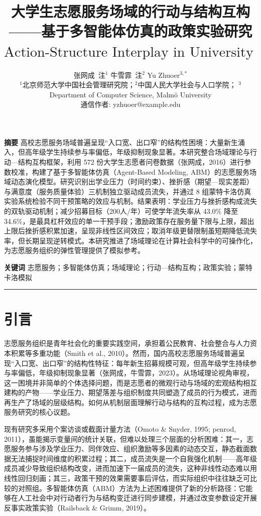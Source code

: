 \documentclass[12pt,a4paper]{article}
\title{\textbf{大学生志愿服务场域的行动与结构互构——基于多智能体仿真的政策实验研究}\\$\text{Action-Structure Interplay in University Volunteering Field: An Agent-Based Policy Experiment}$}
\author{\small 
  张网成\ 注$^1$ \quad 牛雪霏\ 注$^2$ \quad Yu Zhuoer$^{3,*}$
  \\\vspace{0.3em}
  \small $^1$北京师范大学中国社会管理研究院；$^2$中国人民大学社会与人口学院；
  $^{3}$Department of Computer Science, Malmö University
  \\\small *通信作者: yzhuoer@example.edu}
\date{}
\begin{document}
\maketitle
{}
\thispagestyle{empty}

\vspace{1em}
\textbf{摘要} \quad 
高校志愿服务场域普遍呈现“入口宽、出口窄”的结构性困境：大量新生涌入，但高年级学生持续参与率偏低，年级抑制现象显著。本研究整合场域理论与行动—结构互构框架，利用 572 份大学生志愿者问卷数据（张网成，2016）进行参数校准，构建了基于多智能体仿真（Agent-Based Modeling, ABM）的志愿服务场域动态演化模型。研究识别出学业压力（时间约束）、挫折感（期望—现实差距）与满意度（服务质量体验）三机制独立驱动成员流失，并通过 8 组蒙特卡洛仿真实验系统检验不同干预策略的效应与机制。结果表明：学业压力与挫折感构成流失的双轨驱动机制；减少招募目标（200人/年）可使学年流失率从 43.0\% 降至 34.6\%，是最具杠杆效应的单一干预手段；激励政策存在服务量下限与上限，超出上限后挫折感积累加速，呈现非线性区间效应；取消年级更替限制虽短期降低流失率，但长期呈现逆转模式。本研究推进了场域理论在计算社会科学中的可操作化，为志愿服务组织的弹性管理提供了模拟参考。

\vspace{0.5em}
\textbf{关键词} \quad 志愿服务；多智能体仿真；场域理论；行动—结构互构；政策实验；蒙特卡洛模拟

\vspace{1.5em}
\hrule
\vspace{1.5em}

\section{引言}

志愿服务组织是青年社会化的重要实践空间，承担着公民教育、社会整合与人力资本积累等多重功能（Smith et al., 2010）。然而，国内高校志愿服务场域普遍呈现“入口宽、出口窄”的结构性特征：每年新生招募规模可观，但高年级学生持续参与率偏低，年级抑制现象显著（张网成，牛雪霏，2023）。从场域理论视角审视，这一困境并非简单的个体选择问题，而是志愿者的微观行动与场域的宏观结构相互建构的产物——学业压力、期望落差与组织制度共同塑造了成员的行为模式，进而再生产了场域的层级结构。如何从机制层面理解行动与结构的互构过程，成为志愿服务研究的核心议题。

现有研究多采用个案访谈或截面计量方法（Omoto \& Snyder, 1995; penrod, 2011），虽能揭示变量间的统计关联，但难以处理三个层面的分析困难：其一，志愿服务参与涉及学业压力、同伴效应、组织激励等多因素的动态交互，静态截面数据无法捕捉时间维度的积累过程；其二，成员流失是一个自我强化机制——高年级成员减少导致组织结构改变，进而加速下一届成员的流失，这种非线性动态难以用线性回归刻画；其三，政策干预的效果需要事后评估，而实际组织中往往缺乏可比较的对照组。多智能体仿真（ABM）方法为上述困难提供了新的分析路径：它能够在人工社会中对行动者行为与结构变迁进行同步建模，并通过改变参数设定开展反事实政策实验（Railsback \& Grimm, 2019）。
\end{document}
